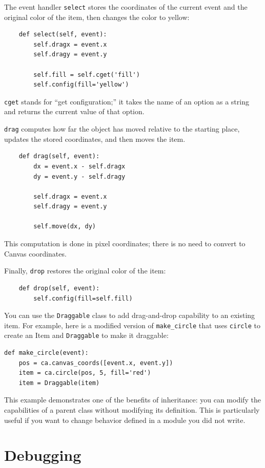 \documentclass[10pt]{book}
\begin{document}
The event handler {\tt select} stores the coordinates
of the current event and the original color of the item, then
changes the color to yellow:

\begin{verbatim}
    def select(self, event):
        self.dragx = event.x
        self.dragy = event.y

        self.fill = self.cget('fill')
        self.config(fill='yellow')
\end{verbatim}
%
{\tt cget} stands for ``get configuration;'' it takes the name of an
option as a string and returns the current value of that option.

{\tt drag} computes how far the object has moved relative to the
starting place, updates the stored coordinates, and then moves the
item.

\begin{verbatim}
    def drag(self, event):
        dx = event.x - self.dragx
        dy = event.y - self.dragy

        self.dragx = event.x
        self.dragy = event.y

        self.move(dx, dy)
\end{verbatim}
%
This computation is done in pixel coordinates; there is no need to
convert to Canvas coordinates.

Finally, {\tt drop} restores the original color of the item:

\begin{verbatim}
    def drop(self, event):
        self.config(fill=self.fill)
\end{verbatim}
%
You can use the {\tt Draggable} class to add drag-and-drop
capability to an existing item.  For example, here is a modified
version of \verb"make_circle" that uses {\tt circle} to create
an Item and {\tt Draggable} to make it draggable:

\begin{verbatim}
def make_circle(event):
    pos = ca.canvas_coords([event.x, event.y])
    item = ca.circle(pos, 5, fill='red')
    item = Draggable(item)
\end{verbatim}
%
This example demonstrates one of the benefits of inheritance: you can
modify the capabilities of a parent class without modifying its
definition.  This is particularly useful if you want to change
behavior defined in a module you did not write.


\section{Debugging}
\end{document}
